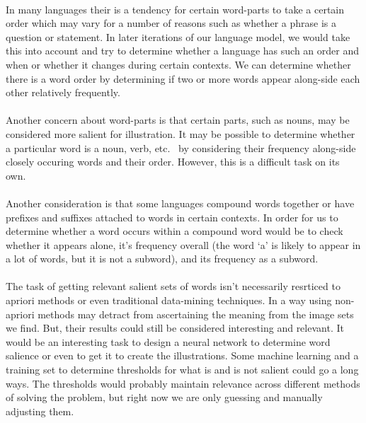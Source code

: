\documentclass[12pt]{article}
\begin{document}
\paragraph{}
In many languages their is a tendency for certain word-parts to take a certain order which may vary for a number of 
reasons such as whether a phrase is a question or statement. In later iterations of our language model, we would take 
this into account and try to determine whether a language has such an order and when or whether it changes during 
certain contexts. We can determine whether there is a word order by determining if two or more words appear 
along-side each other relatively frequently.
\paragraph{}
Another concern about word-parts is that certain parts, such as nouns, may be considered more salient for illustration. 
It may be possible to determine whether a particular word is a noun, verb, etc. \ by considering their frequency 
along-side closely occuring words and their order. However, this is a difficult task on its own.
\paragraph{}
Another consideration is that some languages compound words together or have prefixes and suffixes attached to words in certain contexts. 
In order for us to determine whether a word occurs within a compound word would be to check whether it appears alone, 
it's frequency overall (the word `a' is likely to appear in a lot of words, but it is not a subword), and its frequency as a subword.
\paragraph{}
The task of getting relevant salient sets of words isn't necessarily resrticed to apriori methods or even traditional 
data-mining techniques. In a way using non-apriori methods may detract from ascertaining the meaning from the image sets 
we find. But, their results could still be considered interesting and relevant. It would be an interesting task to design 
a neural network to determine word salience or even to get it to create the illustrations. Some machine learning and a 
training set to determine thresholds for what is and is not salient could go a long ways. The thresholds would probably 
maintain relevance across different methods of solving the problem, but right now we are only guessing and manually 
adjusting them.
\end{document}
